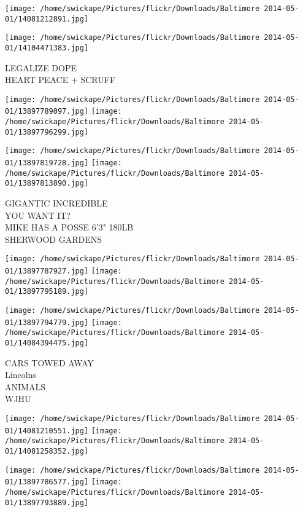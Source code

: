 \documentclass[10pt,letterpaper]{article}
\begin{document}
\texttt{[image: /home/swickape/Pictures/flickr/Downloads/Baltimore 2014-05-01/14081212891.jpg]}

\vspace{0.25in}
\texttt{[image: /home/swickape/Pictures/flickr/Downloads/Baltimore 2014-05-01/14104471383.jpg]}

LEGALIZE DOPE\\
HEART PEACE + SCRUFF\\
\pagebreak

\texttt{[image: /home/swickape/Pictures/flickr/Downloads/Baltimore 2014-05-01/13897789097.jpg]}
\texttt{[image: /home/swickape/Pictures/flickr/Downloads/Baltimore 2014-05-01/13897796299.jpg]}

\texttt{[image: /home/swickape/Pictures/flickr/Downloads/Baltimore 2014-05-01/13897819728.jpg]}
\texttt{[image: /home/swickape/Pictures/flickr/Downloads/Baltimore 2014-05-01/13897813890.jpg]}

GIGANTIC INCREDIBLE\\
YOU WANT IT?\\
MIKE HAS A POSSE 6'3" 180LB\\
SHERWOOD GARDENS\\
\pagebreak

\texttt{[image: /home/swickape/Pictures/flickr/Downloads/Baltimore 2014-05-01/13897787927.jpg]}
\texttt{[image: /home/swickape/Pictures/flickr/Downloads/Baltimore 2014-05-01/13897795189.jpg]}

\texttt{[image: /home/swickape/Pictures/flickr/Downloads/Baltimore 2014-05-01/13897794779.jpg]}
\texttt{[image: /home/swickape/Pictures/flickr/Downloads/Baltimore 2014-05-01/14084394475.jpg]}

CARS TOWED AWAY\\
Lincolns\\
ANIMALS\\
WJHU\\
\pagebreak

\texttt{[image: /home/swickape/Pictures/flickr/Downloads/Baltimore 2014-05-01/14081210551.jpg]}
\texttt{[image: /home/swickape/Pictures/flickr/Downloads/Baltimore 2014-05-01/14081258352.jpg]}

\texttt{[image: /home/swickape/Pictures/flickr/Downloads/Baltimore 2014-05-01/13897786577.jpg]}
\texttt{[image: /home/swickape/Pictures/flickr/Downloads/Baltimore 2014-05-01/13897793889.jpg]}
\end{document}
